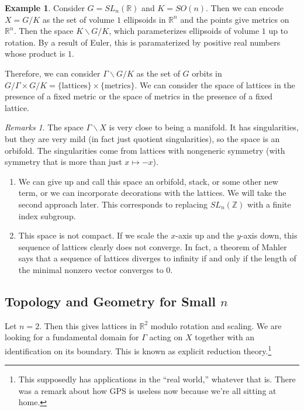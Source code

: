 \documentclass[leqno, openany]{memoir}
\theoremstyle{definition}
\newtheorem{exm}[thm]{Example}
\theoremstyle{remark}
\newtheorem{rmks}[thm]{Remarks}
\theoremstyle{plain}
\theoremstyle{definition}
\theoremstyle{remark}
\newcommand{\R}{\mathbb{R}}
\newcommand{\Z}{\mathbb{Z}}
\begin{document}
\begin{exm}
    Consider $G = SL_n(\R)$ and $K = SO(n)$. Then we can encode $X = G/K$ as the set of volume $1$ ellipsoids in $\R^n$ and the points give metrics on $\R^n$. Then the space $K \backslash G / K$, which parameterizes ellipsoids of volume $1$ up to rotation. By a result of Euler, this is paramaterized by positive real numbers whose product is $1$.
\end{exm}

Therefore, we can consider $\Gamma \backslash G / K$ as the set of $G$ orbits in $G/\Gamma \times G/K = \{ \text{lattices} \} \times \{ \text{metrics} \}$. We can consider the space of lattices in the presence of a fixed metric or the space of metrics in the presence of a fixed lattice.

\begin{rmks}
    The space $\Gamma \backslash X$ is very close to being a manifold. It has singularities, but they are very mild (in fact just quotient singularities), so the space is an orbifold. The singularities come from lattices with nongeneric symmetry (with symmetry that is more than just $x \mapsto -x$).

    \begin{enumerate}
        \item We can give up and call this space an orbifold, stack, or some other new term, or we can incorporate decorations with the lattices. We will take the second approach later. This corresponds to replacing $SL_n(\Z)$ with a finite index subgroup.
        \item This space is not compact. If we scale the $x$-axis up and the $y$-axis down, this sequence of lattices clearly does not converge. In fact, a theorem of Mahler says that a sequence of lattices diverges to infinity if and only if the length of the minimal nonzero vector converges to $0$.
    \end{enumerate}
\end{rmks}

\subsection{Topology and Geometry for Small $n$}%
\label{sub:topology_and_geometry_for_small_n_}

Let $n = 2$. Then this gives lattices in $\R^2$ modulo rotation and scaling. We are looking for a fundamental domain for $\Gamma$ acting on $X$ together with an identification on its boundary. This is known as explicit reduction theory.\footnote{This supposedly has applications in the ``real world,'' whatever that is. There was a remark about how GPS is useless now because we're all sitting at home.}
\end{document}
